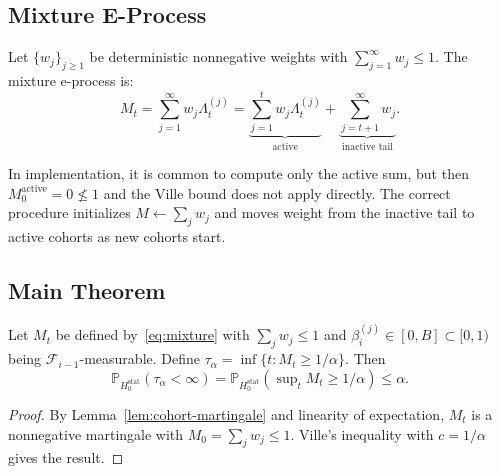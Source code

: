 \documentclass[runningheads]{llncs}
\newcommand{\Hnull}{H_0^{\text{stat}}}
\begin{document}
\subsection{Mixture E-Process}

Let $\{w_j\}_{j \ge 1}$ be deterministic nonnegative weights with
$\sum_{j=1}^\infty w_j \le 1$. The mixture e-process is:
\begin{equation}\label{eq:mixture}
M_t = \sum_{j=1}^\infty w_j \Lambda_t^{(j)}
    = \underbrace{\sum_{j=1}^{t} w_j \Lambda_t^{(j)}}_{\text{active}}
    + \underbrace{\sum_{j=t+1}^{\infty} w_j}_{\text{inactive tail}}.
\end{equation}

\begin{remark}
In implementation, it is common to compute only the active sum, but then
$M_0^{\text{active}} = 0 \not\le 1$ and the Ville bound does not apply
directly. The correct procedure initializes $M \leftarrow \sum_j w_j$ and
moves weight from the inactive tail to active cohorts as new cohorts start.
\end{remark}

\subsection{Main Theorem}

\begin{theorem}\label{thm:layer1}
Let $M_t$ be defined by~\eqref{eq:mixture} with $\sum_j w_j \le 1$ and
$\beta_i^{(j)} \in [0, B] \subset [0, 1)$ being
$\mathcal{F}_{i-1}$-measurable. Define
$\tau_\alpha = \inf\{t: M_t \ge 1/\alpha\}$. Then
\[
\mathbb{P}_{\Hnull}\!\left(\tau_\alpha < \infty\right)
    = \mathbb{P}_{\Hnull}\!\left(\sup\nolimits_t M_t \ge 1/\alpha\right)
    \le \alpha.
\]
\end{theorem}

\begin{proof}
By Lemma~\ref{lem:cohort-martingale} and linearity of expectation,
$M_t$ is a nonnegative martingale with $M_0 = \sum_j w_j \le 1$.
Ville's inequality with $c = 1/\alpha$ gives the result.
\end{proof}
\end{document}
